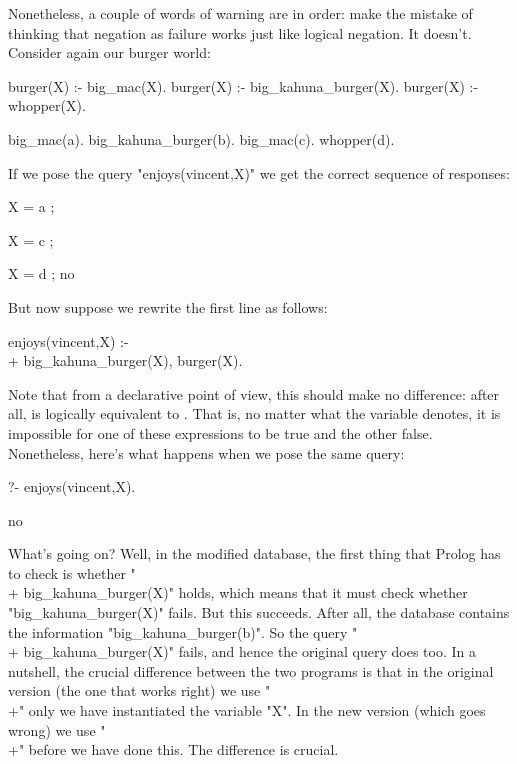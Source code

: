 Nonetheless, a couple of words of warning are in order: 
make the mistake of thinking that negation as failure works just like
logical negation.  It doesn't. Consider again our burger world:

\begin{LPNcodedisplay}
burger(X) :- big_mac(X).
burger(X) :- big_kahuna_burger(X).
burger(X) :- whopper(X).

big_mac(a).
big_kahuna_burger(b).
big_mac(c).
whopper(d).
\end{LPNcodedisplay}

If we pose the query "enjoys(vincent,X)" we get
the correct sequence of responses:
\begin{LPNcodedisplay}
X = a ;

X = c ;

X = d ;
no
\end{LPNcodedisplay}

But now suppose we rewrite the first line as follows:
\begin{LPNcodedisplay}
enjoys(vincent,X) :- \\+ big_kahuna_burger(X), burger(X).
\end{LPNcodedisplay}
Note that from a declarative point of view, this should make no
difference: after all,  is logically equivalent to .  That is, no matter what the variable
 denotes, it is impossible for one of these expressions to
be true and the other false.  Nonetheless, here's what happens
when we pose the same query:


\begin{LPNcodedisplay}
?- enjoys(vincent,X).

no
\end{LPNcodedisplay}




What's going on?  Well, in the modified database, the first thing that
Prolog has to check is whether "\\+ big_kahuna_burger(X)" holds,
which means that it must check whether "big_kahuna_burger(X)"
fails.  But this succeeds. After all, the database contains the
information "big_kahuna_burger(b)". So the query
"\\+ big_kahuna_burger(X)" fails, and hence the original query
does too.  In a nutshell, the crucial difference between the two
programs is that in the original version (the one that works right) we
use "\\+" only  we have instantiated the
variable "X".  In the new version (which goes wrong) we use
"\\+" before we have done this. The difference is crucial.

